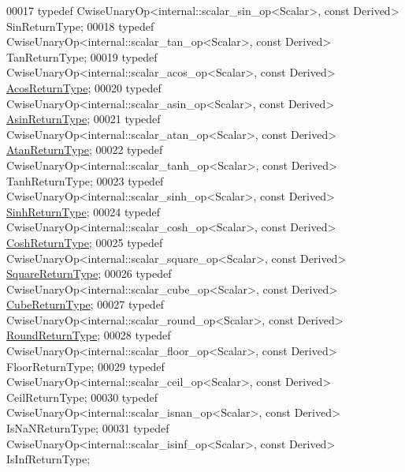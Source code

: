 \begin{DoxyCode}
00017 \textcolor{keyword}{typedef} CwiseUnaryOp<internal::scalar\_sin\_op<Scalar>, \textcolor{keyword}{const} Derived> SinReturnType;
00018 \textcolor{keyword}{typedef} CwiseUnaryOp<internal::scalar\_tan\_op<Scalar>, \textcolor{keyword}{const} Derived> TanReturnType;
00019 \textcolor{keyword}{typedef} CwiseUnaryOp<internal::scalar\_acos\_op<Scalar>, \textcolor{keyword}{const} Derived> 
      \hyperlink{group___core___module_class_eigen_1_1_cwise_unary_op}{AcosReturnType};
00020 \textcolor{keyword}{typedef} CwiseUnaryOp<internal::scalar\_asin\_op<Scalar>, \textcolor{keyword}{const} Derived> 
      \hyperlink{group___core___module_class_eigen_1_1_cwise_unary_op}{AsinReturnType};
00021 \textcolor{keyword}{typedef} CwiseUnaryOp<internal::scalar\_atan\_op<Scalar>, \textcolor{keyword}{const} Derived> 
      \hyperlink{group___core___module_class_eigen_1_1_cwise_unary_op}{AtanReturnType};
00022 \textcolor{keyword}{typedef} CwiseUnaryOp<internal::scalar\_tanh\_op<Scalar>, \textcolor{keyword}{const} Derived> TanhReturnType;
00023 \textcolor{keyword}{typedef} CwiseUnaryOp<internal::scalar\_sinh\_op<Scalar>, \textcolor{keyword}{const} Derived> 
      \hyperlink{group___core___module_class_eigen_1_1_cwise_unary_op}{SinhReturnType};
00024 \textcolor{keyword}{typedef} CwiseUnaryOp<internal::scalar\_cosh\_op<Scalar>, \textcolor{keyword}{const} Derived> 
      \hyperlink{group___core___module_class_eigen_1_1_cwise_unary_op}{CoshReturnType};
00025 \textcolor{keyword}{typedef} CwiseUnaryOp<internal::scalar\_square\_op<Scalar>, \textcolor{keyword}{const} Derived> 
      \hyperlink{group___core___module_class_eigen_1_1_cwise_unary_op}{SquareReturnType};
00026 \textcolor{keyword}{typedef} CwiseUnaryOp<internal::scalar\_cube\_op<Scalar>, \textcolor{keyword}{const} Derived> 
      \hyperlink{group___core___module_class_eigen_1_1_cwise_unary_op}{CubeReturnType};
00027 \textcolor{keyword}{typedef} CwiseUnaryOp<internal::scalar\_round\_op<Scalar>, \textcolor{keyword}{const} Derived> 
      \hyperlink{group___core___module_class_eigen_1_1_cwise_unary_op}{RoundReturnType};
00028 \textcolor{keyword}{typedef} CwiseUnaryOp<internal::scalar\_floor\_op<Scalar>, \textcolor{keyword}{const} Derived> FloorReturnType;
00029 \textcolor{keyword}{typedef} CwiseUnaryOp<internal::scalar\_ceil\_op<Scalar>, \textcolor{keyword}{const} Derived> CeilReturnType;
00030 \textcolor{keyword}{typedef} CwiseUnaryOp<internal::scalar\_isnan\_op<Scalar>, \textcolor{keyword}{const} Derived> IsNaNReturnType;
00031 \textcolor{keyword}{typedef} CwiseUnaryOp<internal::scalar\_isinf\_op<Scalar>, \textcolor{keyword}{const} Derived> IsInfReturnType;

\end{DoxyCode}
